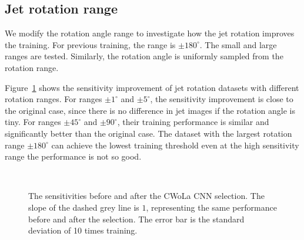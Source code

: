 \documentclass[12pt]{article}
\begin{document}
    \subsection{Jet rotation range}%
    \label{sub:jet_rotation_range}
        We modify the rotation angle range to investigate how the jet rotation improves the training. For previous training, the range is $\pm 180^\circ$. The small and large ranges are tested. Similarly, the rotation angle is uniformly sampled from the rotation range.

        Figure~\ref{fig:sensitivity_improvement_origin_jet_aug_5_range_1_5_45_90_180} shows the sensitivity improvement of jet rotation datasets with different rotation ranges. For ranges $\pm 1^\circ$ and $\pm 5^\circ$, the sensitivity improvement is close to the original case, since there is no difference in jet images if the rotation angle is tiny. For ranges $\pm 45^\circ$ and  $\pm 90^\circ$, their training performance is similar and significantly better than the original case. The dataset with the largest rotation range $\pm 180^\circ$ can achieve the lowest training threshold even at the high sensitivity range the performance is not so good.
        \begin{figure}[htpb]
            \centering
             \\
            \caption{The sensitivities before and after the CWoLa CNN selection. The slope of the dashed grey line is $1$, representing the same performance before and after the selection. The error bar is the standard deviation of 10 times training.}
            \label{fig:sensitivity_improvement_origin_jet_aug_5_range_1_5_45_90_180}
        \end{figure}
\end{document}
